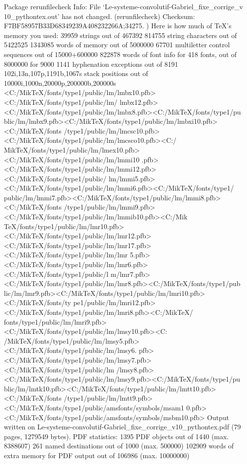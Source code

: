 Package rerunfilecheck Info: File `Le-systeme-convolutif-Gabriel_fixe_corrige_v
10_pythontex.out' has not changed.
(rerunfilecheck)             Checksum: F7BF58957B33D68349239A408232266A;34275.
 ) 
Here is how much of TeX's memory you used:
 39959 strings out of 467392
 814755 string characters out of 5422525
 1343085 words of memory out of 5000000
 67701 multiletter control sequences out of 15000+600000
 822878 words of font info for 418 fonts, out of 8000000 for 9000
 1141 hyphenation exceptions out of 8191
 102i,13n,107p,1191b,1067s stack positions out of 10000i,1000n,20000p,200000b,200000s
<C:/MikTeX/fonts/type1/public/lm/lmbx10.pfb><C:/MikTeX/fonts/type1/public/lm/
lmbx12.pfb><C:/MikTeX/fonts/type1/public/lm/lmbx8.pfb><C:/MikTeX/fonts/type1/pu
blic/lm/lmbx9.pfb><C:/MikTeX/fonts/type1/public/lm/lmbxi10.pfb><C:/MikTeX/fonts
/type1/public/lm/lmcsc10.pfb><C:/MikTeX/fonts/type1/public/lm/lmcsco10.pfb><C:/
MikTeX/fonts/type1/public/lm/lmex10.pfb><C:/MikTeX/fonts/type1/public/lm/lmmi10
.pfb><C:/MikTeX/fonts/type1/public/lm/lmmi12.pfb><C:/MikTeX/fonts/type1/public/
lm/lmmi5.pfb><C:/MikTeX/fonts/type1/public/lm/lmmi6.pfb><C:/MikTeX/fonts/type1/
public/lm/lmmi7.pfb><C:/MikTeX/fonts/type1/public/lm/lmmi8.pfb><C:/MikTeX/fonts
/type1/public/lm/lmmi9.pfb><C:/MikTeX/fonts/type1/public/lm/lmmib10.pfb><C:/Mik
TeX/fonts/type1/public/lm/lmr10.pfb><C:/MikTeX/fonts/type1/public/lm/lmr12.pfb>
<C:/MikTeX/fonts/type1/public/lm/lmr17.pfb><C:/MikTeX/fonts/type1/public/lm/lmr
5.pfb><C:/MikTeX/fonts/type1/public/lm/lmr6.pfb><C:/MikTeX/fonts/type1/public/l
m/lmr7.pfb><C:/MikTeX/fonts/type1/public/lm/lmr8.pfb><C:/MikTeX/fonts/type1/pub
lic/lm/lmr9.pfb><C:/MikTeX/fonts/type1/public/lm/lmri10.pfb><C:/MikTeX/fonts/ty
pe1/public/lm/lmri12.pfb><C:/MikTeX/fonts/type1/public/lm/lmri8.pfb><C:/MikTeX/
fonts/type1/public/lm/lmri9.pfb><C:/MikTeX/fonts/type1/public/lm/lmsy10.pfb><C:
/MikTeX/fonts/type1/public/lm/lmsy5.pfb><C:/MikTeX/fonts/type1/public/lm/lmsy6.
pfb><C:/MikTeX/fonts/type1/public/lm/lmsy7.pfb><C:/MikTeX/fonts/type1/public/lm
/lmsy8.pfb><C:/MikTeX/fonts/type1/public/lm/lmsy9.pfb><C:/MikTeX/fonts/type1/pu
blic/lm/lmtk10.pfb><C:/MikTeX/fonts/type1/public/lm/lmtt10.pfb><C:/MikTeX/fonts
/type1/public/lm/lmtt9.pfb><C:/MikTeX/fonts/type1/public/amsfonts/symbols/msam1
0.pfb><C:/MikTeX/fonts/type1/public/amsfonts/symbols/msbm10.pfb>
Output written on Le-systeme-convolutif-Gabriel_fixe_corrige_v10_pythontex.pdf 
(79 pages, 1279549 bytes).
PDF statistics:
 1395 PDF objects out of 1440 (max. 8388607)
 261 named destinations out of 1000 (max. 500000)
 102909 words of extra memory for PDF output out of 106986 (max. 10000000)

